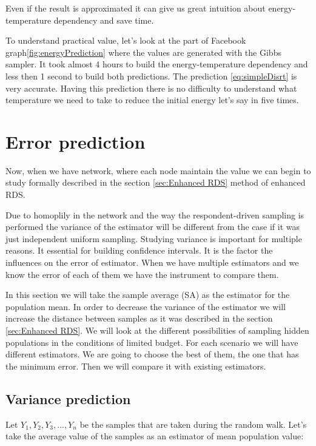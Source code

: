 \documentclass[12pt]{report}
\begin{document}
Even if the result is approximated it can give us great intuition about energy-temperature dependency and save time.

To understand practical value, let's look at the part of Facebook graph\ref{fig:energyPrediction} where the values are generated with the Gibbs sampler. It took almost 4 hours to build the energy-temperature dependency and less then 1 second to build both predictions. The prediction \ref{eq:simpleDisrt} is very accurate. Having this prediction there is no difficulty to understand what temperature we need to take to reduce the initial energy let's say in five times.

\section{Error prediction}

Now, when we have network, where each node maintain the value we can begin to study formally described in the section 
\ref{sec:Enhanced RDS} method of enhanced RDS.

Due to homoplily in the network and the way the respondent-driven sampling is performed the variance of the estimator will be different from the case if it was just independent uniform sampling. Studying variance is important for multiple reasons. It essential for building confidence intervals. It is the factor the influences on the error of estimator. When we have multiple estimators and we know the error of each of them we have the instrument to compare them.


In this section we will take the sample average (SA) as the estimator for the population mean. In order to decrease the variance of the estimator we will increase the distance between samples as it was described in the section \ref{sec:Enhanced RDS}. We will look at the different possibilities of sampling hidden populations in the conditions of limited budget. For each scenario we will have different estimators. We are going to choose the best of them, the one that has the minimum error. Then we will compare it with existing estimators.

\subsection{Variance prediction}

Let $Y_1, Y_2, Y_3,..., Y_n$ be the samples that are taken during the random walk. Let's take the average value of the samples as an estimator of mean population value:
\end{document}
